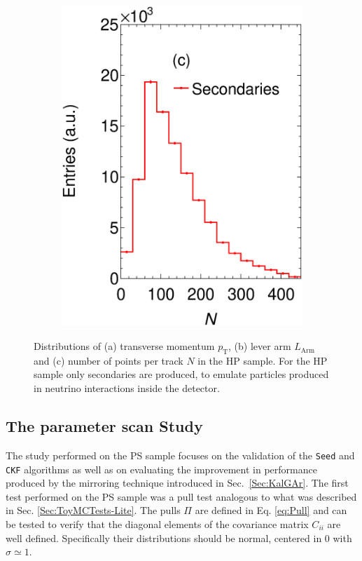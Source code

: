 \begin{figure}[!ht]
\begin{subfigure}[b]{0.32\textwidth}
         \includegraphics[width=\textwidth]{figures/ch5-KF_NDGAr/ToySample/testNDGArMirrorNAllTall.eps}
         \caption{}
         \label{fig:NGAr}
     \end{subfigure}
        \caption[Distributions of (a) transverse momentum $p_{\textrm{T}}$,  (b) lever arm $L_{\textrm{Arm}}$ and (c) number of points per track $N$ in the HP sample.]{Distributions of (a) transverse momentum $p_{\textrm{T}}$,  (b) lever arm $L_{\textrm{Arm}}$ and (c) number of points per track $N$ in the HP sample. For the HP sample only secondaries are produced, to emulate particles produced in neutrino interactions inside the detector. } \label{fig:GArProperties}
\end{figure}


\subsection{The parameter scan Study}
\label{Sec:ParScan}
The study performed on the PS sample focuses on the validation of the \texttt{Seed} and \texttt{CKF} algorithms as well as on evaluating the improvement in performance produced by the mirroring technique introduced in Sec.~\ref{Sec:KalGAr}. The first test performed on the PS sample was a pull test analogous to what was described in Sec. \ref{Sec:ToyMCTests-Lite}. The pulls $\Pi$ are defined in Eq. \ref{eq:Pull} and can be tested to verify that the diagonal elements of the covariance matrix $C_{ii}$ are well defined. Specifically their distributions should be normal, centered in 0  with $\sigma\simeq1$.

